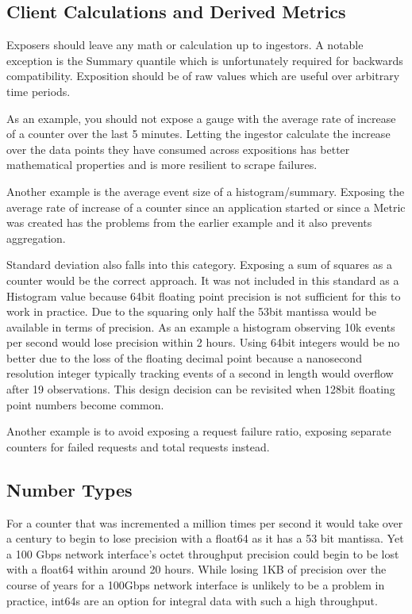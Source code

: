 \documentclass[a4paper,12pt,notitlepage,twoside,openright]{article}
\begin{document}
\hypertarget{client-calculations-and-derived-metrics}{%
\subsection{Client Calculations and Derived
Metrics}\label{client-calculations-and-derived-metrics}}

Exposers should leave any math or calculation up to ingestors. A notable
exception is the Summary quantile which is unfortunately required for
backwards compatibility. Exposition should be of raw values which are
useful over arbitrary time periods.

As an example, you should not expose a gauge with the average rate of
increase of a counter over the last 5 minutes. Letting the ingestor
calculate the increase over the data points they have consumed across
expositions has better mathematical properties and is more resilient to
scrape failures.

Another example is the average event size of a histogram/summary.
Exposing the average rate of increase of a counter since an application
started or since a Metric was created has the problems from the earlier
example and it also prevents aggregation.

Standard deviation also falls into this category. Exposing a sum of
squares as a counter would be the correct approach. It was not included
in this standard as a Histogram value because 64bit floating point
precision is not sufficient for this to work in practice. Due to the
squaring only half the 53bit mantissa would be available in terms of
precision. As an example a histogram observing 10k events per second
would lose precision within 2 hours. Using 64bit integers would be no
better due to the loss of the floating decimal point because a
nanosecond resolution integer typically tracking events of a second in
length would overflow after 19 observations. This design decision can be
revisited when 128bit floating point numbers become common.

Another example is to avoid exposing a request failure ratio, exposing
separate counters for failed requests and total requests instead.

\hypertarget{number-types}{%
\subsection{Number Types}\label{number-types}}

For a counter that was incremented a million times per second it would
take over a century to begin to lose precision with a float64 as it has
a 53 bit mantissa. Yet a 100 Gbps network interface's octet throughput
precision could begin to be lost with a float64 within around 20 hours.
While losing 1KB of precision over the course of years for a 100Gbps
network interface is unlikely to be a problem in practice, int64s are an
option for integral data with such a high throughput.
\end{document}
